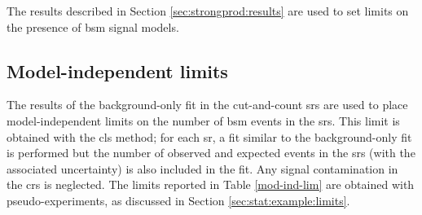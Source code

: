 The results described in Section \ref{sec:strongprod:results} are used to set limits on the presence of \gls{bsm} 
signal models. 

\subsection{Model-independent limits}
\label{sec:strong:modelindepUL}

The results of the background-only fit in the cut-and-count \glspl{sr}
are used to place model-independent limits on the number of \gls{bsm} events in the \glspl{sr}. 
This limit is obtained with the \gls{cls} method; for each \gls{sr}, a fit similar to the background-only fit is performed 
but the number of observed and expected events in the \glspl{sr} (with the associated uncertainty) is also included in the fit. 
Any signal contamination in the \glspl{cr} is neglected. 
The limits reported in Table \ref{mod-ind-lim} are obtained with pseudo-experiments, as discussed in Section \ref{sec:stat:example:limits}.

